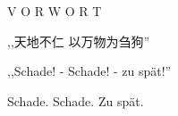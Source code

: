 \documentclass[12pt]{article}
\begin{document}
\begingroup
\begin{center}
\end{center}
\endgroup

\vspace{13\baselineskip}

\begingroup
\begin{center}
\huge V O R W O R T
\end{center}
\endgroup

\vspace{6\baselineskip}

\begingroup
\begin{center}
{\setmainfont{Source Han Serif SC}\selectfont ,,天地不仁 以万物为刍狗'' }
\end{center}
\endgroup

\begingroup
\begin{center}
,,Schade! - Schade! - zu spät!'' 
\end{center}
\endgroup

\begingroup
\begin{center}
Schade. Schade. Zu spät.
\end{center}
\endgroup
\end{document}
